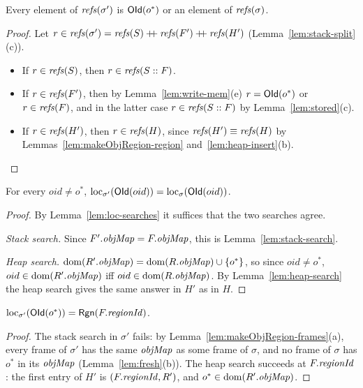 \begin{lemma}
\label{lem:makeObjRegion-refs}
Every element of $\mathit{refs}(\sigma')$ is $\mathsf{OId}(o^*)$ or an element of $\mathit{refs}(\sigma)$.
\end{lemma}
\begin{proof}
Let $r \in \mathit{refs}(\sigma') = \mathit{refs}(S) \mathbin{+\!\!+} \mathit{refs}(F') \mathbin{+\!\!+} \mathit{refs}(H')$
(Lemma~\ref{lem:stack-split}(c)).
\begin{itemize}[nosep]
  \item If $r \in \mathit{refs}(S)$, then $r \in \mathit{refs}(S :: F)$.
  \item If $r \in \mathit{refs}(F')$, then by Lemma~\ref{lem:write-mem}(e) $r = \mathsf{OId}(o^*)$ or
    $r \in \mathit{refs}(F)$, and in the latter case $r \in \mathit{refs}(S :: F)$ by Lemma~\ref{lem:stored}(c).
  \item If $r \in \mathit{refs}(H')$, then $r \in \mathit{refs}(H)$, since $\mathit{refs}(H') \equiv \mathit{refs}(H)$ by
    Lemmas~\ref{lem:makeObjRegion-region} and~\ref{lem:heap-insert}(b). \qedhere
\end{itemize}
\end{proof}

\begin{lemma}
\label{lem:makeObjRegion-loc-eq}
For every $oid \ne o^*$, $\mathrm{loc}_{\sigma'}(\mathsf{OId}(oid)) = \mathrm{loc}_{\sigma}(\mathsf{OId}(oid))$.
\end{lemma}
\begin{proof}
By Lemma~\ref{lem:loc-searches} it suffices that the two searches agree.

\emph{Stack search.} Since $F'.\mathit{objMap} = F.\mathit{objMap}$, this is Lemma~\ref{lem:stack-search}.

\emph{Heap search.} $\mathrm{dom}(R'.\mathit{objMap}) = \mathrm{dom}(R.\mathit{objMap}) \cup \{o^*\}$, so since $oid \ne o^*$,
$oid \in \mathrm{dom}(R'.\mathit{objMap})$ iff $oid \in \mathrm{dom}(R.\mathit{objMap})$. By Lemma~\ref{lem:heap-search} the heap search
gives the same answer in $H'$ as in $H$.
\end{proof}

\begin{lemma}
\label{lem:makeObjRegion-loc-fresh}
$\mathrm{loc}_{\sigma'}(\mathsf{OId}(o^*)) = \mathsf{Rgn}(F.\mathit{regionId})$.
\end{lemma}
\begin{proof}
The stack search in $\sigma'$ fails: by Lemma~\ref{lem:makeObjRegion-frames}(a), every frame of
$\sigma'$ has the same $\mathit{objMap}$ as some frame of $\sigma$, and no frame of $\sigma$ has $o^*$ in its
$\mathit{objMap}$ (Lemma~\ref{lem:fresh}(b)). The heap search succeeds at $F.\mathit{regionId}$: the first entry of $H'$ is
$(F.\mathit{regionId}, R')$, and $o^* \in \mathrm{dom}(R'.\mathit{objMap})$.
\end{proof}

